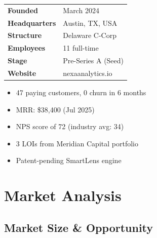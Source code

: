 \documentclass[11pt,a4paper]{article}
\newcommand{\sectionicon}[1]{\textcolor{NexaTeal}{#1}\hspace{4pt}}
\begin{document}
\noindent
\begin{minipage}[t]{0.48\linewidth}
  \begin{tcolorbox}[nexacard, title={\faInfo\enspace Company Facts}]
    \small
    \begin{tabular}{@{}ll@{}}
      \textbf{Founded}      & March 2024 \\[3pt]
      \textbf{Headquarters} & Austin, TX, USA \\[3pt]
      \textbf{Structure}    & Delaware C-Corp \\[3pt]
      \textbf{Employees}    & 11 full-time \\[3pt]
      \textbf{Stage}        & Pre-Series A (Seed) \\[3pt]
      \textbf{Website}      & nexaanalytics.io \\[3pt]
    \end{tabular}
  \end{tcolorbox}
\end{minipage}\hfill
\begin{minipage}[t]{0.48\linewidth}
  \begin{tcolorbox}[nexacard, title={\faTrophy\enspace Traction Highlights}]
    \small
    \begin{itemize}[leftmargin=14pt, itemsep=3pt]
      \item[\textcolor{NexaTeal}{\faCheckCircle}] 47 paying customers, 0 churn in 6 months
      \item[\textcolor{NexaTeal}{\faCheckCircle}] MRR: \$38,400 (Jul 2025)
      \item[\textcolor{NexaTeal}{\faCheckCircle}] NPS score of 72 (industry avg: 34)
      \item[\textcolor{NexaTeal}{\faCheckCircle}] 3 LOIs from Meridian Capital portfolio
      \item[\textcolor{NexaTeal}{\faCheckCircle}] Patent-pending SmartLens engine
    \end{itemize}
  \end{tcolorbox}
\end{minipage}

\par

\section{\sectionicon{\faChartBar}Market Analysis}

\subsection{Market Size \& Opportunity}
\end{document}

